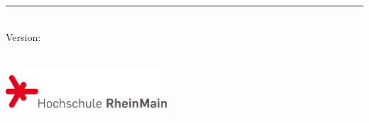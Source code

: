 %
\begin{titlepage}
	\flushright
	\hfill
	\vfill
	{\LARGE\thesisTitle \par}
	\rule[5pt]{\textwidth}{.4pt} \par
	{\Large\thesisName}
	\vfill
	\textit{\large\thesisDate} \\
	Version: \thesisVersion
\end{titlepage}


\begin{titlepage}
	\tgherosfont
	\centering

	{\Large \thesisUniversity} \\[4mm]
	\includegraphics[width=6cm]{pictures/hsrm_logo} \\[2mm]
	\textsf{\thesisUniversityDepartment} \\
	\textsf{\thesisUniversityInstitute} \\

	\vfill
	{\large \thesisSubject} \\[5mm]
	{\LARGE \color{ctcolortitle}\textbf{\thesisTitle} \\[10mm]}
	{\Large \thesisName} \\


\end{titlepage}
